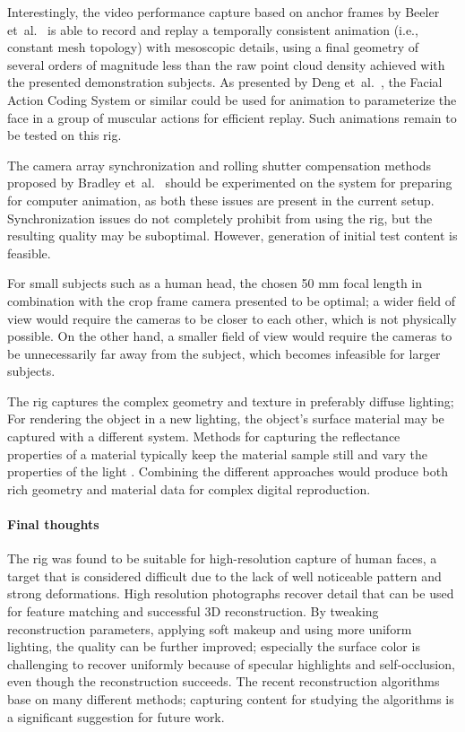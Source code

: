 Interestingly, the video performance capture based on anchor frames by Beeler et~al.\ \cite{beeler2011high} is able to record and replay a temporally consistent animation (i.e., constant mesh topology) with mesoscopic details, using a final geometry of several orders of magnitude less than the raw point cloud density achieved with the presented demonstration subjects.
As presented by Deng et~al.\ \cite{deng2007computer}, the Facial Action Coding System or similar could be used for animation to parameterize the face in a group of muscular actions for efficient replay.
Such animations remain to be tested on this rig.

The camera array synchronization and rolling shutter compensation methods proposed by Bradley et~al.\ \cite{bradley2009synchronization} should be experimented on the system for preparing for computer animation, as both these issues are present in the current setup.
Synchronization issues do not completely prohibit from using the rig, but the resulting quality may be suboptimal.
However, generation of initial test content is feasible.

For small subjects such as a human head, the chosen 50 mm focal length in combination with the crop frame camera presented to be optimal; a wider field of view would require the cameras to be closer to each other, which is not physically possible.
On the other hand, a smaller field of view would require the cameras to be unnecessarily far away from the subject, which becomes infeasible for larger subjects.

The rig captures the complex geometry and texture in preferably diffuse lighting;
For rendering the object in a new lighting, the object's surface material may be captured with a different system.
Methods for capturing the reflectance properties of a material typically keep the material sample still and vary the properties of the light \cite{debevec2000acquiring,aittala2013practical}.
Combining the different approaches would produce both rich geometry and material data for complex digital reproduction.

\paragraph{Final thoughts}
The rig was found to be suitable for high-resolution capture of human faces, a target that is considered difficult due to the lack of well noticeable pattern and strong deformations.
High resolution photographs recover detail that can be used for feature matching and successful 3D reconstruction.
By tweaking reconstruction parameters, applying soft makeup and using more uniform lighting, the quality can be further improved;
especially the surface color is challenging to recover uniformly because of specular highlights and self-occlusion, even though the reconstruction succeeds.
The recent reconstruction algorithms base on many different methods; capturing content for studying the algorithms is a significant suggestion for future work.

